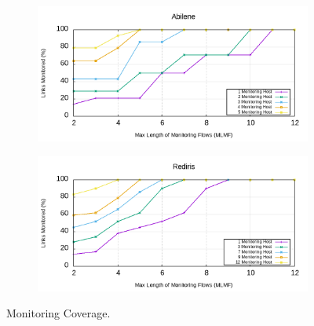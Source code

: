 \documentclass[10pt, journal, letterpaper]{IEEEtran}
\begin{document}
\begin{figure}
    \begin{subfigure}{0.49\columnwidth}
       \centering
        \includegraphics[width=\columnwidth]{img/eval_Abilene_Max_Length_of_Routes_Links_Monitored.png}
        \label{fig:eval_Abilene_Max_Length_of_Routes_Links_Monitored}
    \end{subfigure}
    \begin{subfigure}{0.49\columnwidth}
      \centering
      \includegraphics[width=\columnwidth]{img/eval_Rediris_Max_Length_of_Routes_Links_Monitored.png}
     \label{fig:eval_RedIris_Max_Length_of_Routes_Links_Monitored}
    \end{subfigure}
    \caption{Monitoring Coverage.}
    \label{fig:Max_Length_of_Routes_Links_Monitored}
\end{figure}
\end{document}

